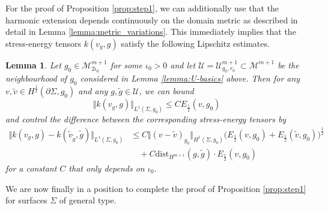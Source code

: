 \documentclass[10pt,reqno]{amsart}
\theoremstyle{plain}
\newtheorem{lemma}{Lemma}[section]
\theoremstyle{definition}
\numberwithin{equation}{section}
\newcommand{\Si}{\Sigma}
\newcommand{\norm}[1]{\Vert#1\Vert}
\newcommand{\beq}{\begin{equation}}
\newcommand{\eeq}{\end{equation}}
\newcommand{\beqa}{\begin{equation}\begin{aligned}}
\newcommand{\eeqa}{\end{aligned}\end{equation}}
\newcommand{\half}{\frac{1}{2}}
\newcommand{\dist}{\text{dist}}
\newcommand{\Eh}{E_{\half}} %
\newcommand{\pSi}{{\partial \Sigma}}
\newcommand{\MM}{\mathcal{M}} %
\newcommand{\UU}{{\mathcal U}}
\newcommand{\MMtwoiota}{\MM_{2\iota_0}}
\begin{document}
For the proof of Proposition \ref{prop:step1}, we can additionally use that the harmonic extension depends continuously on the domain metric as described in detail in Lemma \ref{lemma:metric_variations}. This immediately implies that the stress-energy tensors $k(v_g,g)$ satisfy the following Lipschitz estimates.

\begin{lemma}\label{lemma:extension-basic}
    Let $g_0\in \MMtwoiota^{m+1}$ for some $\iota_0>0$ and let $\UU=\UU^{m+1}_{g_0,r_0}\subset\MM^{m+1} $ be the neighbourhood of $g_0$ considered in Lemma \ref{lemma:U-basics} above. Then for any $v,\tilde v\in H^{\half}(\pSi,g_0)$ and any $g,\tilde g\in \UU$, we can bound 
    \beq\label{est:k-L1-energy}
        \norm{k(v_g,g)}_{L^1(\Si,g_0)}\leq C \Eh(v,g_0)
    \eeq
    and control the difference between the corresponding stress-energy tensors by
    \beqa\label{est:basic_3}
        \norm{k(v_g,g)-k(\tilde v_{\tilde g},\tilde g)}_{L^1(\Si,g_0)} &\leq C\norm{(v-\tilde v)_{g_0}}_{H^1(\Si,g_0)}\big(\Eh(v,g_0)+ \Eh(\tilde v,g_0)\big)^\half\\
        &\quad +C\dist_{H^{m+1}}(g,\tilde g)\cdot \Eh(v,g_0)
    \eeqa
    for a constant $C$ that only depends on $\iota_0$. 
\end{lemma}

We are now finally in a position to complete the proof of Proposition \ref{prop:step1} for surfaces $\Si$ of general type. 
\end{document}
